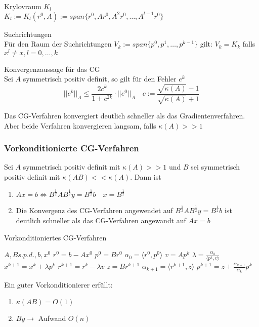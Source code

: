 \begin{definition}
 Krylovraum $K_{l}$
\\
	$K_{l}:=K_{l}(r^{0},A):=span\{r^{0},Ar^{0},A^{2}r^{0},\ldots,A^{l-1}r^{0}\}$
\end{definition}

\begin{theorem}
	Suchrichtungen
	\\
	Für den Raum der Suchrichtungen $V_{k} :=span\{p^{0},p^{1},\ldots,p^{k-1}\}$ gilt: $V_{k}=K_{k}$ falls $x^{l}\not = x,l=0,\ldots,k$
\end{theorem}

\begin{theorem}
	Konvergenzaussage für das CG
	\\
	Sei $A$ symmetrisch positiv definit, so gilt für den Fehler $e^{k}$
	$$||e^{k}||_{A}\le \frac{2c^{k}}{1+c^{2k}}\cdot ||e^{0}||_{A}\quad c:=\frac{\sqrt{\kappa(A)}-1}{\sqrt{\kappa(A)}+1}$$
\end{theorem}

\begin{remark}
	Das CG-Verfahren konvergiert deutlich schneller als das Gradientenverfahren. Aber beide Verfahren konvergieren langsam, falls $\kappa(A)>>1$
\end{remark}

\subsubsection{Vorkonditionierte CG-Verfahren}
Sei $A$ symmetrisch positiv definit mit $\kappa(A)>>1$ und $B$ sei symmetrisch positiv definit mit $\kappa(AB)<<\kappa(A)$. Dann
ist
\begin{enumerate}
	\item $Ax=b \Leftrightarrow B^{\frac{1}{2}}AB^{\frac{1}{2}}y=B^{\frac{1}{2}}b\quad x=B^{\frac{1}{2}}$
	\item Die Konvergenz des CG-Verfahren angewendet auf $B^{\frac{1}{2}}AB^{\frac{1}{2}}y=B^{\frac{1}{2}}b$ ist deutlich schneller als
	das CG-Verfahren angewandt auf $Ax=b$
\end{enumerate}

\begin{algorithm}
	\caption{Vorkonditioniertes CG-Verfahren}
	\begin{algorithmic}
		\STATE $A,B s.p.d.,b,x^{0}$
		\STATE $r^{0}=b-Ax^{0}$
		\STATE $p^{0}=Br^{0}$
		\STATE $\alpha_{0}=\langle r^{0},p^{0}\rangle$
			\STATE $v=Ap^{k}$
			\STATE $\lambda = \frac{\alpha_{k}}{\langle p^{k},v\rangle}$
			\STATE $x^{k+1}=x^{k}+\lambda p^{k}$
			\STATE $r^{k+1}=r^{k} - \lambda v$
			\STATE $z=Br^{k+1}$
			\STATE $\alpha_{k+1}=\langle r^{k+1},z\rangle$
			\STATE $p^{k+1} = z + \frac{\alpha_{k+1}}{\alpha_{k}}p^{k}$
		\ENDFOR
	\end{algorithmic}
\end{algorithm}

\begin{remark}
	Ein guter Vorkonditionierer erfüllt:
	\begin{enumerate}
		\item $\kappa(AB)=O(1)$
		\item $By\rightarrow $ Aufwand $O(n)$
	\end{enumerate}
\end{remark}